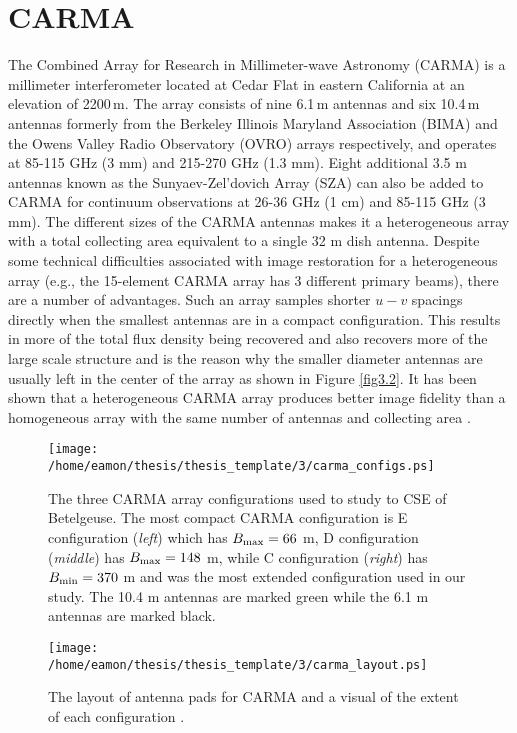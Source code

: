 \section{CARMA}\label{sec:3.2}

The Combined Array for Research in Millimeter-wave Astronomy (CARMA) \citep{bock_2006} is a millimeter interferometer located at Cedar Flat in eastern California at an elevation of 2200\,m. The array consists of nine 6.1\,m antennas and six 10.4\,m antennas formerly from the Berkeley Illinois Maryland Association (BIMA) and the Owens Valley Radio Observatory (OVRO) arrays respectively, and operates at 85-115 GHz (3 mm) and 215-270 GHz (1.3 mm). Eight additional 3.5 m antennas known as the Sunyaev-Zel'dovich Array (SZA) can also be added to CARMA for continuum observations at 26-36 GHz (1 cm) and 85-115 GHz (3 mm). The different sizes of the CARMA antennas makes it a heterogeneous array with a  total collecting area equivalent to a single 32 m dish antenna. Despite some technical difficulties associated with image restoration for a heterogeneous array (e.g., the 15-element CARMA array has 3 different primary beams), there are a number of advantages. Such an array samples shorter $u-v$ spacings directly when the smallest antennas are in a compact configuration. This results in more of the total flux density being recovered and also recovers more of the large scale structure and is the reason why the smaller diameter antennas are usually left in the center of the array as shown in Figure \ref{fig3.2}. It has been shown that a heterogeneous CARMA array produces better image fidelity than a homogeneous array with the same number of antennas and collecting area \citep{wright_1999}. 

\begin{figure}[!ht]
\centering 
          \texttt{[image: /home/eamon/thesis/thesis\_template/3/carma\_configs.ps]}
\caption[The three CARMA array configurations used.]{The three CARMA array configurations used to study to CSE of Betelgeuse. The most compact CARMA configuration is E configuration (\textit{left}) which has $B_{\rm{max}}=66$ m, D configuration (\textit{middle}) has $B_{\rm{max}}=148$ m, while C configuration (\textit{right}) has $B_{\rm{min}}=370$ m and was the most extended configuration used in our study. The 10.4 m antennas are marked green while the 6.1 m antennas are marked black.}
\label{fig3.2}
\centering 
          \texttt{[image: /home/eamon/thesis/thesis\_template/3/carma\_layout.ps]}
\caption[The layout of antenna pads for CARMA.]{The layout of antenna pads for CARMA and a visual of the extent of each configuration \citep{bock_2006}.}
\label{fig3.3}
\end{figure}

